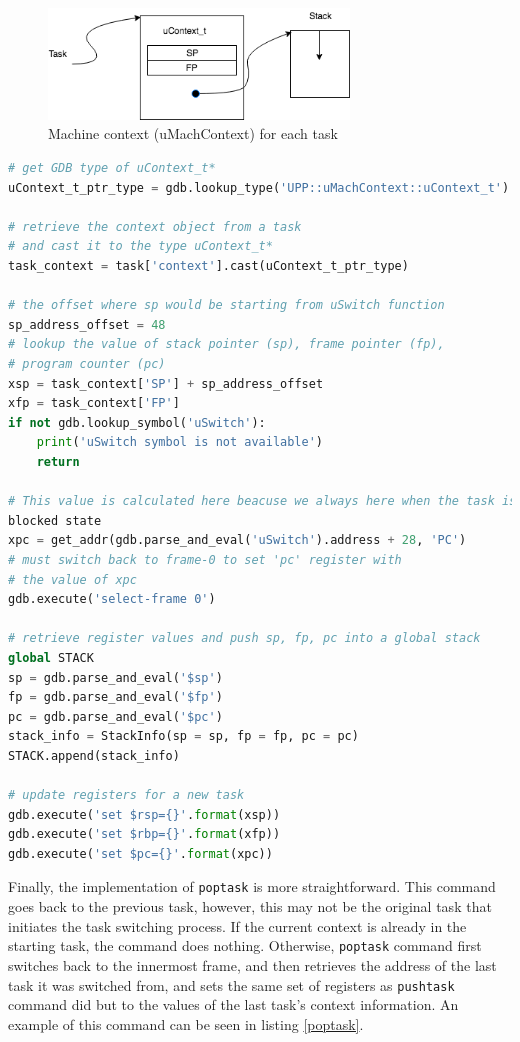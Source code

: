 \begin{figure}[h]
    \caption{Machine context (uMachContext) for each task}
    \includegraphics[width=8cm]{uContext_stack}
    \centering
\end{figure}

\begin{lstlisting}[language=Python, caption={Abridged \text{push\_task} source
code}, label={pushtask-code}, fontstyle=\small]
# get GDB type of uContext_t*
uContext_t_ptr_type = gdb.lookup_type('UPP::uMachContext::uContext_t').pointer

# retrieve the context object from a task
# and cast it to the type uContext_t*
task_context = task['context'].cast(uContext_t_ptr_type)

# the offset where sp would be starting from uSwitch function
sp_address_offset = 48
# lookup the value of stack pointer (sp), frame pointer (fp),
# program counter (pc)
xsp = task_context['SP'] + sp_address_offset
xfp = task_context['FP']
if not gdb.lookup_symbol('uSwitch'):
    print('uSwitch symbol is not available')
    return

# This value is calculated here beacuse we always here when the task is in
blocked state
xpc = get_addr(gdb.parse_and_eval('uSwitch').address + 28, 'PC')
# must switch back to frame-0 to set 'pc' register with
# the value of xpc
gdb.execute('select-frame 0')

# retrieve register values and push sp, fp, pc into a global stack
global STACK
sp = gdb.parse_and_eval('$sp')
fp = gdb.parse_and_eval('$fp')
pc = gdb.parse_and_eval('$pc')
stack_info = StackInfo(sp = sp, fp = fp, pc = pc)
STACK.append(stack_info)

# update registers for a new task
gdb.execute('set $rsp={}'.format(xsp))
gdb.execute('set $rbp={}'.format(xfp))
gdb.execute('set $pc={}'.format(xpc))
\end{lstlisting}

Finally, the implementation of \verb|poptask| is more straightforward. This command goes back to the previous task, however, this may not be the original
task that initiates the task switching process. If the current context is
already in the starting task, the command does nothing. Otherwise,
\verb|poptask| command first switches back to the innermost frame, and then
retrieves the
address of the last task it was switched from, and sets the same set of registers as
\verb|pushtask| command did but to the values of the last task's context
information. An example of this command can be seen in listing \ref{poptask}.

